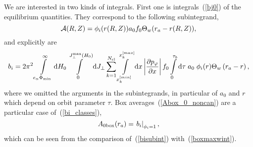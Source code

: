 \documentclass[preprint,prb,aps]{revtex4-1}
\newcommand{\be}[1]{\begin{equation} \label{#1}}
\newcommand{\ee}{\end{equation}}
\newcommand{\eq}[1]{(\ref{#1})}
\newcommand{\difp}[2]{\frac{\partial #1}{\partial #2}}
\newcommand{\rd}{{\rm d}}
\newcommand{\cA}{{\cal A}}
\begin{document}
We are interested in two kinds of integrals. First one is integrals~\eq{bj0}
of the equilibrium quantities. They correspond to the following subintegrand,
\be{bisubint}
\cA(R,Z)=\phi_i(r(R,Z)) a_0 f_0 \Theta_w(r_a-r(R,Z)),
\ee
and explicitly are 
\be{bi_classes}
b_i=2\pi^2
\int\limits_{e_\alpha\Phi_{\rm min}}^\infty \rd H_0
\int\limits_0^{J_\perp^{\rm max}(H_0)} \rd J_\perp
\sum\limits_{k=1}^{N_{\rm cl}}
\int\limits_{x^{[min]}_k}^{x^{[max]}_k} \rd x
\left|\difp{p_\varphi}{x}\right| f_0
\int\limits_0^{\tau_b} \rd \tau\;
a_0\; \phi_i(r)
\Theta_w\left(r_a-r\right),
\ee
where we omitted the arguments in the subintegrands, in particular
of $a_0$ and $r$ which depend on orbit parameter $\tau$. Box 
averages~\eq{Abox_0_noncan} are a particular case of~\eq{bi_classes},
\be{boxav_classes}
A_{0\rm box}(r_a)=\left.b_i\right|_{\phi_i=1},
\ee
which can be seen from the comparison of~\eq{bisubint} with~\eq{boxmaxwint}.
\end{document}
